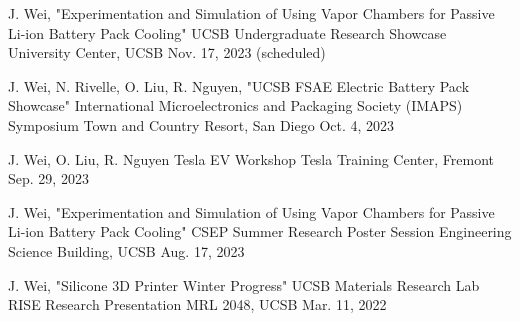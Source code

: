 


\begin{cventries}

\cventry
{J. Wei, "Experimentation and Simulation of Using Vapor Chambers for Passive Li-ion Battery Pack Cooling"} %
{UCSB Undergraduate Research Showcase} %
{University Center, UCSB} %
{Nov. 17, 2023 (scheduled)} %
{ %
\begin{cvitems}
\end{cvitems}
}

\cventry
{J. Wei, N. Rivelle, O. Liu, R. Nguyen, "UCSB FSAE Electric Battery Pack Showcase"} %
{International Microelectronics and Packaging Society (IMAPS) Symposium} %
{Town and Country Resort, San Diego} %
{Oct. 4, 2023} %
{ %
\begin{cvitems}
\end{cvitems}
}


\cventry
{J. Wei, O. Liu, R. Nguyen} %
{Tesla EV Workshop} %
{Tesla Training Center, Fremont} %
{Sep. 29, 2023} %
{ %
\begin{cvitems}
\end{cvitems}
}


\cventry
{J. Wei, "Experimentation and Simulation of Using Vapor Chambers for Passive Li-ion Battery Pack Cooling"} %
{CSEP Summer Research Poster Session} %
{Engineering Science Building, UCSB} %
{Aug. 17, 2023} %
{ %
\begin{cvitems}
\end{cvitems}
}

\cventry
{J. Wei, "Silicone 3D Printer Winter Progress"} %
{UCSB Materials Research Lab RISE Research Presentation} %
{MRL 2048, UCSB} %
{Mar. 11, 2022} %
{ %
\begin{cvitems}
\end{cvitems}
}



\end{cventries}